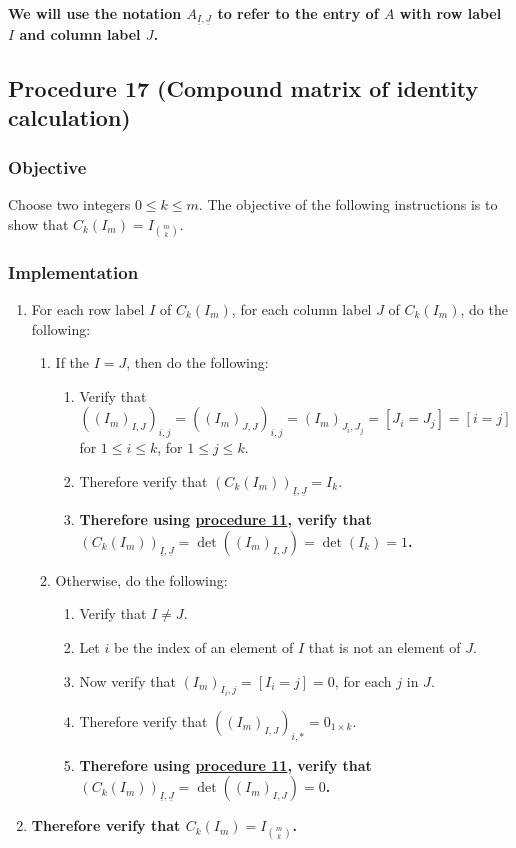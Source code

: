 \documentclass[twocolumn]{article}
\newcommand{\ul}[1]{\underline{#1}}
\begin{document}
			\textbf{We will use the notation $A_{\ul{I},\ul{J}}$ to refer to the entry of $A$ with row label $I$ and column label $J$.}
		\subsection{Procedure 17 (Compound matrix of identity calculation)}\label{sec:procedure 17}
			\subsubsection{Objective}
				Choose two integers $0\le k\le m$. The objective of the following instructions is to show that $C_k(I_m)=I_{\binom{m}{k}}$.
			\subsubsection{Implementation}
				\begin{enumerate}
					\item For each row label $I$ of $C_k(I_m)$, for each column label $J$ of $C_k(I_m)$, do the following:
					\begin{enumerate}
						\item If the $I=J$, then do the following:
						\begin{enumerate}
							\item Verify that $((I_m)_{I,J})_{i,j}=((I_m)_{J,J})_{i,j}=(I_m)_{J_i,J_j}=[J_i=J_j]=[i=j]$ for $1\le i\le k$, for $1\le j\le k$.
							\item Therefore verify that $(C_k(I_m))_{\ul{I},\ul{J}}=I_k$.
							\item \textbf{Therefore using \hyperref[sec:procedure 11]{procedure 11}, verify that $(C_k(I_m))_{\ul{I},\ul{J}}=\det((I_m)_{I,J})=\det(I_k)=1$.}
						\end{enumerate}
						\item Otherwise, do the following:
						\begin{enumerate}
							\item Verify that $I\ne J$.
							\item Let $i$ be the index of an element of $I$ that is not an element of $J$.
							\item Now verify that $(I_m)_{I_i,j}=[I_i=j]=0$, for each $j$ in $J$.
							\item Therefore verify that $((I_m)_{I,J})_{i,*}=0_{1\times k}$.
							\item \textbf{Therefore using \hyperref[sec:procedure 11]{procedure 11}, verify that $(C_k(I_m))_{\ul{I},\ul{J}}=\det((I_m)_{I,J})=0$.}
						\end{enumerate}
					\end{enumerate}
					\item \textbf{Therefore verify that $C_k(I_m)=I_{\binom{m}{k}}$.}	
				\end{enumerate}
\end{document}
